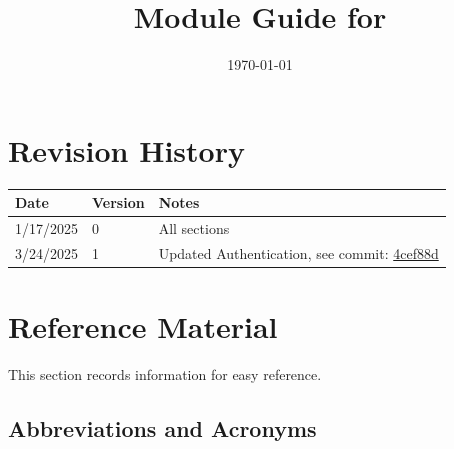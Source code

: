 \documentclass[12pt, titlepage]{article}
\begin{document}
\title{Module Guide for \progname{}} 
\author{\authname}
\date{\today}

\maketitle


\section{Revision History}

\begin{tabularx}{\textwidth}{p{3cm}p{2cm}X}
\toprule {\bf Date} & {\bf Version} & {\bf Notes}\\
\midrule
1/17/2025 & 0 & All sections\\
3/24/2025 & 1 & Updated Authentication, see commit: \href{https://github.com/ausbennett/mes-finance-platform/commit/4cef88de4d7c2a664fa8e2395804251c0a6baeb4}{4cef88d}\\
\bottomrule
\end{tabularx}

\newpage

\section{Reference Material}

This section records information for easy reference.

\subsection{Abbreviations and Acronyms}

\renewcommand{\arraystretch}{1.2}
\end{document}
